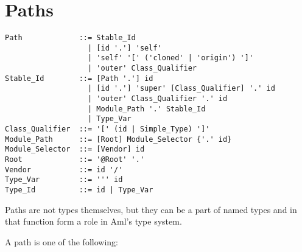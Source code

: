 \section{Paths}
\label{sec:type-paths}

\syntax\begin{lstlisting}
Path             ::= Stable_Id
                   | [id '.'] 'self'
                   | 'self' '[' ('cloned' | 'origin') ']'
                   | 'outer' Class_Qualifier
Stable_Id        ::= [Path '.'] id
                   | [id '.'] 'super' [Class_Qualifier] '.' id
                   | 'outer' Class_Qualifier '.' id
                   | Module_Path '.' Stable_Id
                   | Type_Var
Class_Qualifier  ::= '[' (id | Simple_Type) ']'
Module_Path      ::= [Root] Module_Selector {'.' id}
Module_Selector  ::= [Vendor] id
Root             ::= '@Root' '.'
Vendor           ::= id '/'
Type_Var         ::= ''' id
Type_Id          ::= id | Type_Var
\end{lstlisting}

Paths are not types themselves, but they can be a part of named types and in that function form a role in Aml's type system. 

A path is one of the following:

